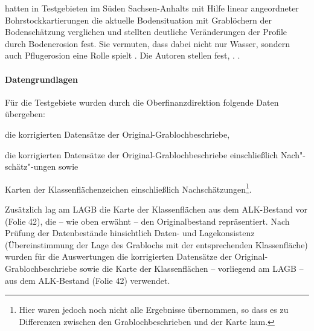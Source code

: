 \citet{geoflux_Schmidt-etal2009mlu} hatten in Testgebieten im Süden Sachsen-Anhalts mit Hilfe linear angeordneter Bohrstockkartierungen die aktuelle Bodensituation mit Grablöchern der Bodenschätzung verglichen und stellten deutliche Veränderungen der Profile durch Bodenerosion fest. Sie vermuten, dass dabei nicht nur Wasser, sondern auch Pflugerosion eine Rolle spielt \citep[s.a.][]{MoellerVolk2015geoderma}. Die Autoren stellen fest,  \citep[S. 31]{geoflux_Schmidt-etal2009mlu}.  \citep[S. 20]{geoflux_Schmidt-etal2009mlu}.




\paragraph{Datengrundlagen}
Für die Testgebiete wurden durch die Oberfinanzdirektion folgende Daten übergeben:
\begin{compactenum}
	\item die korrigierten Datensätze der Original-Grablochbeschriebe,
	\item die korrigierten Datensätze der Original-Grablochbeschriebe einschließlich Nach"-schätz"-ungen sowie 
 \item Karten der Klassenflächenzeichen einschließlich Nachschätzungen\footnote{Hier waren jedoch noch nicht alle Ergebnisse übernommen, so dass es zu Differenzen zwischen den Grablochbeschrieben und der Karte kam.}.
\end{compactenum}



Zusätzlich lag am LAGB die Karte der Klassenflächen aus dem ALK-Bestand vor (Folie 42), die -- wie oben erwähnt --  den Originalbestand repräsentiert. Nach Prüfung der Datenbestände hinsichtlich Daten- und Lagekonsistenz (Übereinstimmung der Lage des Grablochs mit der entsprechenden Klassenfläche) wurden für die Auswertungen die korrigierten Datensätze der Original-Grablochbeschriebe sowie die Karte der Klassenflächen -- vorliegend am LAGB --  aus dem ALK-Bestand (Folie 42) verwendet.\

